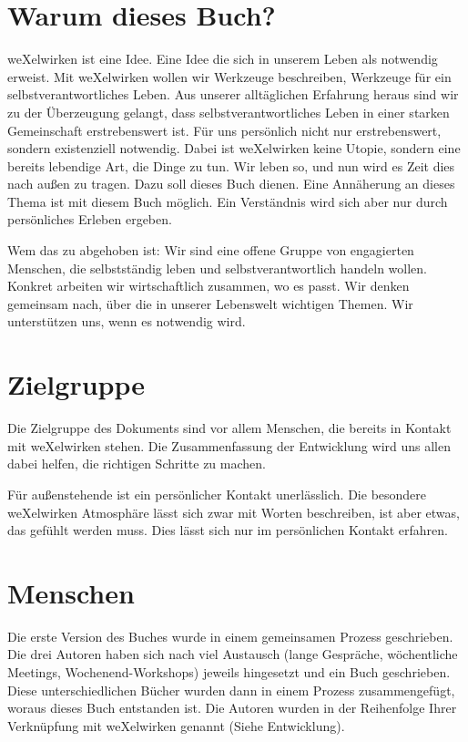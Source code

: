   \section{Warum dieses Buch?}
weXelwirken ist eine Idee.
%
Eine Idee die sich in unserem Leben als notwendig erweist. 
%
Mit weXelwirken wollen wir Werkzeuge beschreiben, Werkzeuge für ein selbstverantwortliches Leben.
%
Aus unserer alltäglichen Erfahrung heraus sind wir zu der Überzeugung gelangt, dass selbstverantwortliches Leben in einer starken Gemeinschaft erstrebenswert ist.
%
Für uns persönlich nicht nur erstrebenswert, sondern existenziell notwendig.
%
Dabei ist weXelwirken keine Utopie, sondern eine bereits lebendige Art, die Dinge zu tun.
%
Wir leben so, und nun wird es Zeit dies nach außen zu tragen.
%
Dazu soll dieses Buch dienen.
%
Eine Annäherung an dieses Thema ist mit diesem Buch möglich.
%
Ein Verständnis wird sich aber nur durch persönliches Erleben ergeben.



Wem das zu abgehoben ist: Wir sind eine offene Gruppe von engagierten Menschen, die selbstständig leben und selbstverantwortlich handeln wollen.
%
Konkret arbeiten wir wirtschaftlich zusammen, wo es passt.
%
Wir denken gemeinsam nach, über die in unserer Lebenswelt wichtigen Themen.
%
Wir unterstützen uns, wenn es notwendig wird.
  \section{Zielgruppe}
Die Zielgruppe des Dokuments sind vor allem Menschen, die bereits in Kontakt mit weXelwirken stehen.
%
Die Zusammenfassung der Entwicklung wird uns allen dabei helfen, die richtigen Schritte zu machen. 



Für außenstehende ist ein persönlicher Kontakt unerlässlich.
%
Die besondere weXelwirken Atmosphäre lässt sich zwar mit Worten beschreiben, ist aber etwas, das gefühlt werden muss.
%
Dies lässt sich nur im persönlichen Kontakt erfahren.
  \section{Menschen}
Die erste Version des Buches wurde in einem gemeinsamen Prozess geschrieben.
%
Die drei Autoren haben sich nach viel Austausch (lange Gespräche, wöchentliche Meetings, Wochenend-Workshops) jeweils hingesetzt und ein Buch geschrieben.
%
Diese unterschiedlichen Bücher wurden dann in einem Prozess zusammengefügt, woraus dieses Buch entstanden ist.
%
Die Autoren wurden in der Reihenfolge Ihrer Verknüpfung mit weXelwirken genannt (Siehe Entwicklung).
